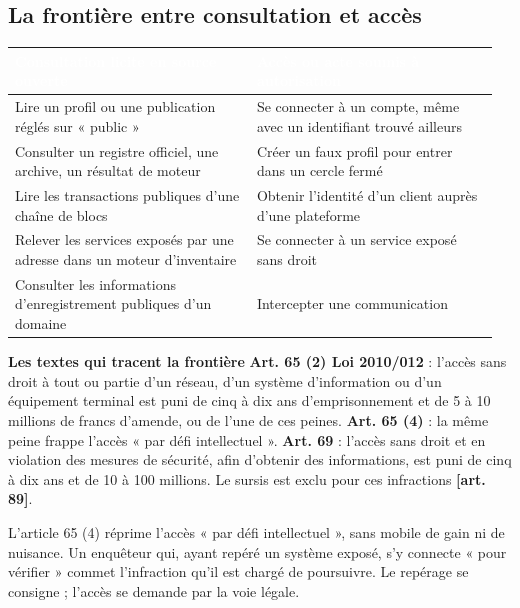 \subsection{La frontière entre consultation et accès}

\begin{longtable}{p{0.48\linewidth}p{0.48\linewidth}}
\rowcolor{TableauEntete}\textcolor{white}{\bfseries Consultation licite en source ouverte} & \textcolor{white}{\bfseries Accès ou acte soumis à autorisation} \\ \hline
Lire un profil ou une publication réglés sur « public » & Se connecter à un compte, même avec un identifiant trouvé ailleurs \\
Consulter un registre officiel, une archive, un résultat de moteur & Créer un faux profil pour entrer dans un cercle fermé \\
Lire les transactions publiques d'une chaîne de blocs & Obtenir l'identité d'un client auprès d'une plateforme \\
Relever les services exposés par une adresse dans un moteur d'inventaire & Se connecter à un service exposé sans droit \\
Consulter les informations d'enregistrement publiques d'un domaine & Intercepter une communication \\
\end{longtable}

\begin{boxjuris}
\textbf{Les textes qui tracent la frontière}
\textbf{Art. 65 (2) Loi 2010/012} : l'accès sans droit à tout ou partie d'un réseau, d'un système d'information ou d'un équipement terminal est puni de cinq à dix ans d'emprisonnement et de 5 à 10 millions de francs d'amende, ou de l'une de ces peines. \textbf{Art. 65 (4)} : la même peine frappe l'accès « par défi intellectuel ». \textbf{Art. 69} : l'accès sans droit et en violation des mesures de sécurité, afin d'obtenir des informations, est puni de cinq à dix ans et de 10 à 100 millions. Le sursis est exclu pour ces infractions \textbf{[art. 89]}.
\end{boxjuris}

\begin{boxalert}
L'article 65 (4) réprime l'accès « par défi intellectuel », sans mobile de gain ni de nuisance. Un enquêteur qui, ayant repéré un système exposé, s'y connecte « pour vérifier » commet l'infraction qu'il est chargé de poursuivre. Le repérage se consigne ; l'accès se demande par la voie légale.
\end{boxalert}

